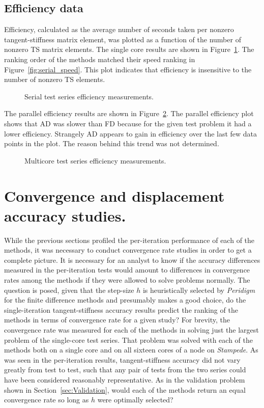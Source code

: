 \documentclass[preprint,12pt]{elsarticle}
\begin{document}
\subsection{Efficiency data}
%
Efficiency, calculated as the average number of seconds taken per nonzero tangent-stiffness matrix element, was plotted as a function of the number of nonzero TS matrix elements. The single core results are shown in Figure~\ref{fig:serial_efficiency}.  The ranking order of the methods matched their speed ranking in Figure~\ref{fig:serial_speed}. This plot indicates that efficiency is insensitive to the number of nonzero TS elements.  
%
\begin{figure}[tbp]
  \centering
  \scalebox{0.9}{}
  \caption{Serial test series efficiency measurements.}
  \label{fig:serial_efficiency}
\end{figure}
%
The parallel efficiency results are shown in Figure~\ref{fig:multi_efficiency}. The parallel efficiency plot shows that AD was slower than FD because for the given test problem it had a lower efficiency. Strangely AD appears to gain in efficiency over the last few data points in the plot. The reason behind this trend was not determined.
%
\begin{figure}[tbp]
  \centering
  \scalebox{0.9}{}
  \caption{Multicore test series efficiency measurements.}
  \label{fig:multi_efficiency}
\end{figure}



\section{Convergence and displacement accuracy studies.} 
\label{sec:PeridigmConvergenceStudy}
%
While the previous sections profiled the per-iteration performance of each of the methods, it was necessary to conduct convergence rate studies in order to get a complete picture. It is necessary for an analyst to know if the accuracy differences measured in the per-iteration tests would amount to differences in convergence rates among the methods if they were allowed to solve problems normally. The question is posed, given that the step-size $h$ is heuristically selected by \emph{Peridigm} for the finite difference methods and presumably makes a good choice, do the single-iteration tangent-stiffness accuracy results predict the ranking of the methods in terms of convergence rate for a given study? For brevity, the convergence rate was measured for each of the methods in solving just the largest problem of the single-core test series. That problem was solved with each of the methods both on a single core and on all sixteen cores of a  node on \emph{Stampede}. As was seen in the per-iteration results, tangent-stiffness accuracy did not vary greatly from test to test, such that any pair of tests from the two series could have been considered reasonably representative. As in the validation problem shown in Section~\ref{sec:Validation}, would each of the methods return an equal convergence rate so long as $h$ were optimally selected? 
\end{document}
